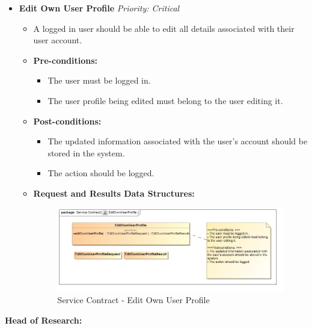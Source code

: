 \documentclass{article}
\begin{document}
\begin{itemize}
					\cleardoublepage
					\item \textbf{Edit Own User Profile} \hfill \textit{Priority: Critical}
					\begin{itemize}
						\item A logged in user should be able to edit all details associated with their user account.
						\item \textbf{Pre-conditions:}
						\begin{itemize}
							\item The user must be logged in.
							\item The user profile being edited must belong to the user editing it.
						\end{itemize}
						\item \textbf{Post-conditions:}
						\begin{itemize}
							\item The updated information associated with the user's account should be stored in the system.
							\item The action should be logged.
						\end{itemize}
						\item \textbf{Request and Results Data Structures:}
						\begin{figure}[H]
							\includegraphics[width=\linewidth]{../Diagrams/ServiceContracts/EditOwnUserProfile.jpg}
							\caption{Service Contract - Edit Own User Profile}
						\end{figure}
					\end{itemize}							
				\end{itemize}
				\cleardoublepage
				\textbf{Head of Research:}
				
\end{document}
